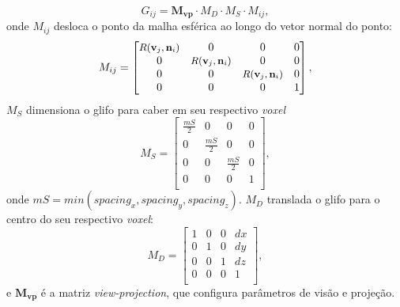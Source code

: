 \begin{equation}
    G_{ij} = \mathbf{M_{vp}}\cdot M_D \cdot M_S \cdot M_{ij},
\end{equation}
onde $M_{ij}$ desloca o ponto da malha esférica ao longo do vetor normal do ponto: 
\begin{equation}
\label{eq::dodf}
    M_{ij} = \begin{bmatrix} 
   \mbox{\small $R( \mathbf{v}_j, \mathbf{n}_i)$} & 0 & 0 & 0 \\
    0 & \mbox{\small $R( \mathbf{v}_j, \mathbf{n}_i)$}  & 0 & 0 \\
    0 & 0 & \mbox{\small $R( \mathbf{v}_j, \mathbf{n}_i)$}  & 0 \\
    0 & 0 & 0 & 1 \\
\end{bmatrix},
\end{equation}
$M_{S}$ dimensiona o glifo para caber em seu respectivo \textit{voxel}
\begin{equation}
    M_{S} = \begin{bmatrix} 
    \frac{mS}{2} & 0             & 0            & 0 \\
    0            & \frac{mS}{2} & 0            & 0 \\
    0            & 0             & \frac{mS}{2} & 0 \\
    0            & 0             & 0            & 1 \\
\end{bmatrix},
\end{equation}
onde $mS = min(spacing_x , spacing_y , spacing_z)$.
$M_{D}$ translada o glifo para o centro do seu respectivo \textit{voxel}:
\begin{equation}
\label{eq::displace}
    M_{D} = \begin{bmatrix} 
    1 & 0 & 0 & dx \\
    0 & 1 & 0 & dy \\
    0 & 0 & 1 & dz \\
    0 & 0 & 0 & 1 \\
\end{bmatrix},
\end{equation}
e $\mathbf{M_{vp}}$ é a matriz \textit{view-projection}, que configura parâmetros de visão e projeção.



